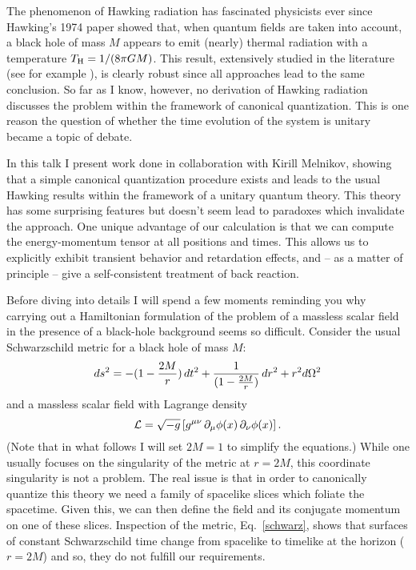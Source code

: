 \documentclass[12pt]{article}
\begin{document}
The phenomenon of Hawking radiation has fascinated physicists
ever since Hawking's 1974 paper\cite{hawking} showed that, when
quantum fields are taken into account,
a black hole of mass $M$ appears to emit (nearly) thermal radiation with a temperature 
$T_{\rm H} = 1/(8\pi G M)$.  This result, extensively studied in the literature
(see for example \cite{unruh,jacobson,parikh}), is clearly
robust since all approaches lead to the same conclusion.
So far as I know, however, no derivation of Hawking
radiation discusses the problem within the framework of canonical quantization.
This is one reason the question of whether the time evolution of
the system is unitary became a topic of debate.

In this talk I present work\cite{bhlett} done in collaboration with Kirill Melnikov,
showing that a simple canonical quantization procedure exists and
leads to the usual Hawking results within the framework of a unitary
quantum theory.  This theory has some surprising
features but doesn't seem lead to paradoxes which invalidate the approach.
One unique advantage of our calculation is that we can compute the energy-momentum
tensor at all positions and times.  This allows us to explicitly
exhibit transient behavior and retardation effects, and --
as a matter of principle -- give a self-consistent treatment 
of back reaction.

Before diving into details I will spend a few moments reminding you why
carrying out a Hamiltonian formulation of the problem
of a massless scalar field in the presence of a black-hole background
seems so difficult.  Consider the usual Schwarzschild metric for a
black hole of mass $M$:
\begin{equation}
	ds^2 = -(1-{2M\over r})\,dt^2 + {1\over (1- {2M\over r})}\,dr^2 + r^2 d\Omega^2
\label{schwarz}
\end{equation}
and a massless scalar field with Lagrange density
\begin{equation}
	{\cal L} = \sqrt{-g} \left[ g^{\mu \nu} \,\partial_\mu \phi(x)\,
	 \partial_\nu \phi(x) \right] .
\end{equation}
(Note that in what follows I will set $2M = 1$ to simplify the equations.)
While one usually focuses on the singularity of the metric
at $r=2M$, this coordinate singularity is not a problem.  The real 
issue is that in order to canonically quantize this theory we need a family of
spacelike slices which foliate the spacetime.  Given this, we can then define 
the field and its conjugate momentum on one of these slices.
Inspection of the metric, Eq.~\ref{schwarz}, shows that surfaces of constant
Schwarzschild time change from spacelike to timelike at the horizon ($r=2M$)
and so, they do not fulfill our requirements.  
\end{document}
